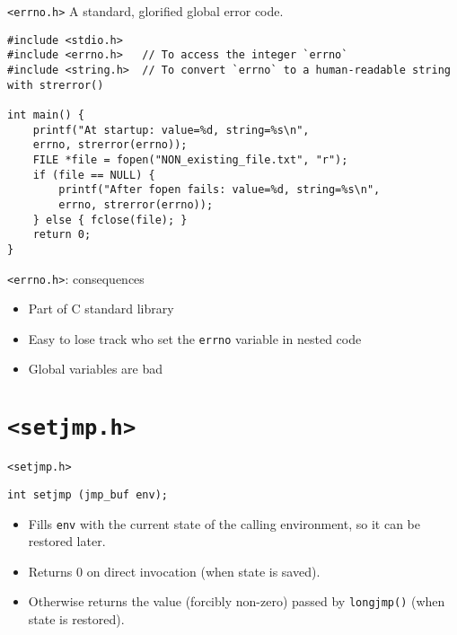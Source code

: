 \documentclass[aspectratio=169,14pt]{beamer}
\begin{document}
\begin{frame}[fragile]{\texttt{<errno.h>}}
A standard, glorified global error code.

\begin{lstlisting}[style=cstyle]
#include <stdio.h>
#include <errno.h>   // To access the integer `errno`
#include <string.h>  // To convert `errno` to a human-readable string with strerror()

int main() {
    printf("At startup: value=%d, string=%s\n",
    errno, strerror(errno));
    FILE *file = fopen("NON_existing_file.txt", "r");
    if (file == NULL) {
        printf("After fopen fails: value=%d, string=%s\n",
        errno, strerror(errno));
    } else { fclose(file); }
    return 0;
}
\end{lstlisting}
\end{frame}



\begin{frame}{\texttt{<errno.h>}: consequences}
\begin{itemize}
    \item[\good] Part of C standard library
    \item[\bad] Easy to lose track who set the \texttt{errno} variable in nested code
    \item[\bad] Global variables are bad
\end{itemize}
\end{frame}





\section{\texttt{<setjmp.h>}}

\begin{frame}[fragile]{\texttt{<setjmp.h>}}
\begin{lstlisting}[style=cstyle]
int setjmp (jmp_buf env);
\end{lstlisting}
\begin{itemize}
    \item Fills \texttt{env} with the current state of the calling environment, so it can be restored later.
    \item Returns 0 on direct invocation (when state is saved).
    \item Otherwise returns the value (forcibly non-zero) passed by \texttt{longjmp()} (when state is restored).
\end{itemize}
\end{frame}
\end{document}
